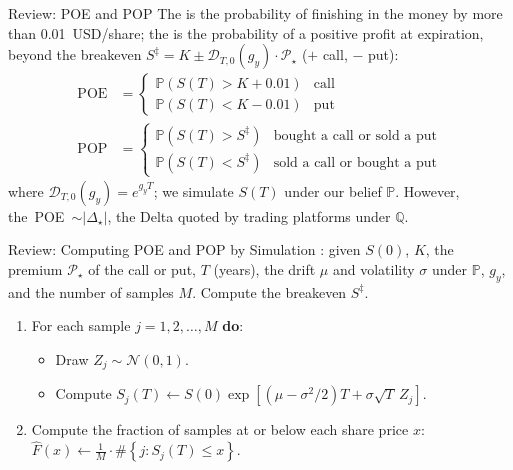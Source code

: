 \documentclass[aspectratio=169,11pt]{beamer}
\newcommand{\Q}{\mathbb{Q}}
\newcommand{\Dc}{\mathcal{D}}
\newcommand{\Pc}{\mathcal{P}}
\begin{document}
\begin{frame}{Review: POE and POP}
  \vspace{0.3em}
  The  is the probability of finishing in the money by more than 0.01~USD/share;
  the  is the probability of a positive profit at expiration, beyond
  the breakeven $S^{\ddagger}=K\pm\Dc_{T,0}(g_{y})\cdot\Pc_{\star}$ ($+$ call, $-$ put):
  \begin{equation*}
    \boxed{
    \begin{aligned}
      \text{POE} &= \begin{cases}
      \mathbb{P}\left(S(T)>K+0.01\right) & \text{call}\\
      \mathbb{P}\left(S(T)<K-0.01\right) & \text{put}
      \end{cases}\\[0.3em]
      \text{POP} &= \begin{cases}
      \mathbb{P}\left(S(T)>S^{\ddagger}\right) & \text{bought a call or sold a put}\\
      \mathbb{P}\left(S(T)<S^{\ddagger}\right) & \text{sold a call or bought a put}
      \end{cases}
    \end{aligned}}
  \end{equation*}
  where $\Dc_{T,0}(g_{y})=e^{g_{y}T}$; we simulate $S(T)$ under our belief $\mathbb{P}$.
  However, the~POE~$\sim|\Delta_{\star}|$, the Delta quoted by trading platforms under $\Q$.
\end{frame}

\begin{frame}{Review: Computing POE and POP by Simulation}
  \vspace{0.3em}
  : given $S(0)$, $K$, the premium $\Pc_{\star}$ of the
  call or put, $T$ (years), the drift $\mu$ and volatility $\sigma$ under
  $\mathbb{P}$, $g_{y}$, and the number of samples $M$. Compute the breakeven
  $S^{\ddagger}$.
  \begin{enumerate}\setlength{\itemsep}{0.35em}
    \item For each sample $j=1,2,\dots,M$ \textbf{do}:
      \begin{itemize}
        \item[a.] Draw $Z_{j}\sim\mathcal{N}(0,1)$.
        \item[b.] Compute
          $S_{j}(T)\gets S(0)\exp\left[\left(\mu-\sigma^{2}/2\right)T+\sigma\sqrt{T}\,Z_{j}\right]$.
      \end{itemize}
    \item Compute the fraction of samples at or below each share price $x$:
      $\hat{F}(x)\gets\frac{1}{M}\cdot\#\left\{j:S_{j}(T)\leq x\right\}$.
  \end{enumerate}
\end{frame}
\end{document}
